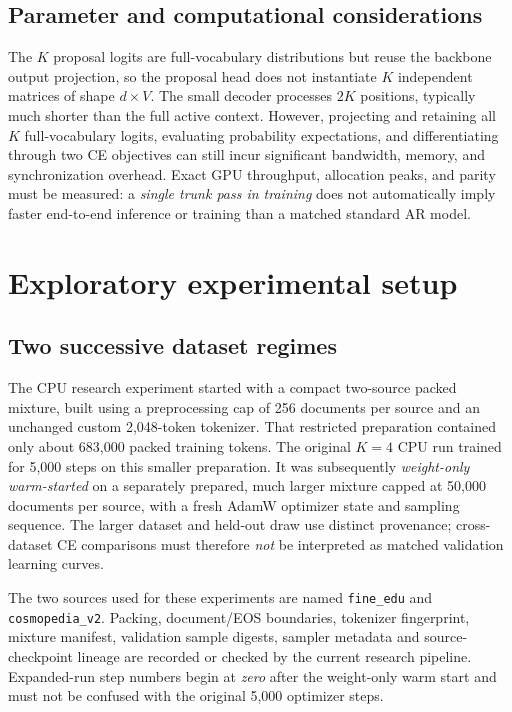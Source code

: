 \documentclass[11pt,letterpaper]{article}
\newcommand{\code}[1]{\texttt{#1}}
\begin{document}
\subsection{Parameter and computational considerations}
The $K$ proposal logits are full-vocabulary distributions but reuse the backbone output projection, so the proposal head does not instantiate $K$ independent matrices of shape $d\times V$. The small decoder processes $2K$ positions, typically much shorter than the full active context. However, projecting and retaining all $K$ full-vocabulary logits, evaluating probability expectations, and differentiating through two CE objectives can still incur significant bandwidth, memory, and synchronization overhead. Exact GPU throughput, allocation peaks, and parity must be measured: a \emph{single trunk pass in training} does not automatically imply faster end-to-end inference or training than a matched standard AR model.

\section{Exploratory experimental setup}
\subsection{Two successive dataset regimes}
The CPU research experiment started with a compact two-source packed mixture, built using a preprocessing cap of 256 documents per source and an unchanged custom 2,048-token tokenizer. That restricted preparation contained only about 683,000 packed training tokens. The original $K=4$ CPU run trained for 5,000 steps on this smaller preparation. It was subsequently \emph{weight-only warm-started} on a separately prepared, much larger mixture capped at 50,000 documents per source, with a fresh AdamW optimizer state and sampling sequence. The larger dataset and held-out draw use distinct provenance; cross-dataset CE comparisons must therefore \emph{not} be interpreted as matched validation learning curves.

The two sources used for these experiments are named \code{fine\_edu} and \code{cosmopedia\_v2}. Packing, document/EOS boundaries, tokenizer fingerprint, mixture manifest, validation sample digests, sampler metadata and source-checkpoint lineage are recorded or checked by the current research pipeline. Expanded-run step numbers begin at \emph{zero} after the weight-only warm start and must not be confused with the original 5,000 optimizer steps.
\end{document}
